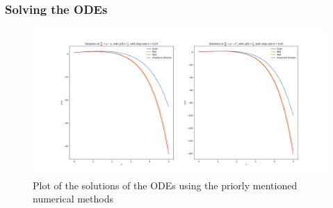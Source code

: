 \documentclass{beamer}
\begin{document}
\begin{frame}
    \frametitle{Solving the ODEs}
    \begin{figure}[h]
        \centering
        \includegraphics[width=\linewidth]{"solutions.png"}
        \caption{Plot of the solutions of the ODEs using the priorly mentioned numerical methods}
    \end{figure}
\end{frame}
\end{document}
